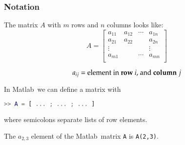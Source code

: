 \documentclass[10pt]{beamer}
\begin{document}
\begin{frame}[fragile]
\frametitle{Notation}

The matrix $A$ with $m$ rows and $n$ columns looks like:
\begin{equation*}
    A = \begin{bmatrix} a_{11} & a_{12} & \cdots & a_{1n} \\
                        a_{21} & a_{22} &        & a_{2n} \\
                        \vdots &        &        & \vdots \\
                        a_{m1} &        & \cdots & a_{mn} \\
        \end{bmatrix}
\end{equation*}

\begin{equation*}
    a_{ij} = \text{element in \textbf{row} $i$, and \textbf{column} $j$}
\end{equation*}

In Matlab\ we can define a matrix with
\begin{lstlisting}[language=matlab]
>> A = [ ... ; ... ; ... ]
\end{lstlisting}
where semicolons separate lists of row elements.

The $a_{2,3}$ element of the Matlab\ matrix \texttt{A} is \texttt{A(2,3)}.


\end{frame}
\end{document}
